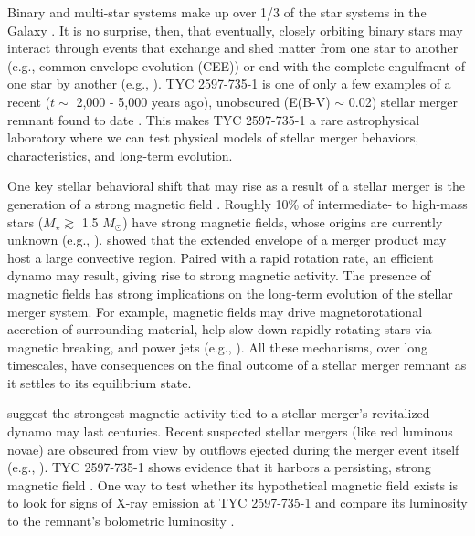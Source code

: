\documentclass[]{aastex631}
\begin{document}
Binary and multi-star systems make up over 1/3 of the star systems in the Galaxy \citep{Raghavan+2010}. It is no surprise, then, that eventually, closely orbiting binary stars may interact through events that exchange and shed matter from one star to another (e.g., common envelope evolution (CEE)) or end with the complete engulfment of one star by another (e.g., \citealt{Ivanova+2013}). TYC 2597-735-1 is one of only a few examples of a recent ($t \sim$ 2,000 - 5,000 years ago), unobscured (E(B-V) $\sim$ 0.02) stellar merger remnant found to date \citep{2020Natur.587..387H}. This makes TYC 2597-735-1 a rare astrophysical laboratory where we can test physical models of stellar merger behaviors, characteristics, and long-term evolution.

One key stellar behavioral shift that may rise as a result of a stellar merger is the generation of a strong magnetic field \citep{Schneider+2016}. Roughly 10\% of intermediate- to high-mass stars ($M_{\star} \gtrsim$ 1.5 $M_{\odot}$) have strong magnetic fields, whose origins are currently unknown (e.g., \citealt{Donati+2009,Fossati+2015,Grunhut+2017}). \citet{Soker&Tylenda2007} showed that the extended envelope of a merger product may host a large convective region. Paired with a rapid rotation rate, an efficient dynamo may result, giving rise to strong magnetic activity. The presence of magnetic fields has strong implications on the long-term evolution of the stellar merger system. For example, magnetic fields may drive magnetorotational accretion of surrounding material, help slow down rapidly rotating stars via magnetic breaking, and power jets (e.g., \citealt{Schneider+2020}). All these mechanisms, over long timescales, have consequences on the final outcome of a stellar merger remnant as it settles to its equilibrium state.

\citet{Soker&Tylenda2007} suggest the strongest magnetic activity tied to a stellar merger's revitalized dynamo may last centuries. Recent suspected stellar mergers (like red luminous novae) are obscured from view by outflows ejected during the merger event itself (e.g., \citealt{Bond+2003, Tylenda+2016}). TYC 2597-735-1 shows evidence that it harbors a persisting, strong magnetic field \citep[e.g., H$\alpha$ emission and variability, radial velocity shifts strongly correlated with the Ca II IRT stellar atmospheric features][]{2020Natur.587..387H}. One way to test whether its hypothetical magnetic field exists is to look for signs of X-ray emission at TYC 2597-735-1 and compare its luminosity to the remnant's bolometric luminosity \citep{Soker&Tylenda2007}.
\end{document}
